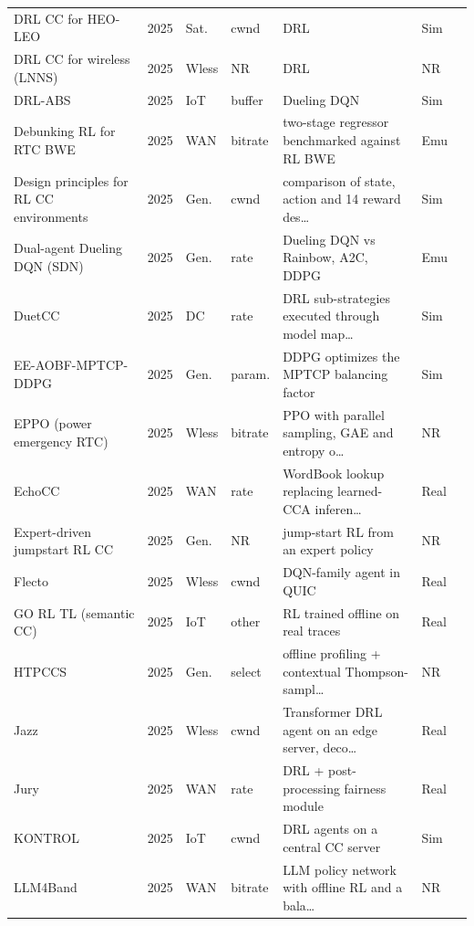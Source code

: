 \begin{small}
\begin{longtable}{@{}L{4.2cm}lllL{4.6cm}ll@{}}
DRL CC for HEO-LEO~\cite{liu2025intelligent} & 2025 & Sat. & cwnd & DRL & Sim &  \\
DRL CC for wireless (LNNS)~\cite{zala2025effective} & 2025 & Wless & NR & DRL & NR &  \\
DRL-ABS~\cite{pan2025drl} & 2025 & IoT & buffer & Dueling DQN & Sim &  \\
Debunking RL for RTC BWE~\cite{song2025debunking} & 2025 & WAN & bitrate & two-stage regressor benchmarked against RL BWE & Emu &  \\
Design principles for RL CC environments~\cite{kiarie2025design} & 2025 & Gen. & cwnd & comparison of state, action and 14 reward des… & Sim &  \\
Dual-agent Dueling DQN (SDN)~\cite{boussaoud2025dual} & 2025 & Gen. & rate & Dueling DQN vs Rainbow, A2C, DDPG & Emu &  \\
DuetCC~\cite{chengfeng2025duetcc} & 2025 & DC & rate & DRL sub-strategies executed through model map… & Sim &  \\
EE-AOBF-MPTCP-DDPG~\cite{rao2025enhancing} & 2025 & Gen. & param. & DDPG optimizes the MPTCP balancing factor & Sim &  \\
EPPO (power emergency RTC)~\cite{liu2025research} & 2025 & Wless & bitrate & PPO with parallel sampling, GAE and entropy o… & NR &  \\
EchoCC~\cite{yu2025echocc} & 2025 & WAN & rate & WordBook lookup replacing learned-CCA inferen… & Real &  \\
Expert-driven jumpstart RL CC~\cite{kiarie2025expert} & 2025 & Gen. & NR & jump-start RL from an expert policy & NR &  \\
Flecto~\cite{serra2025flecto} & 2025 & Wless & cwnd & DQN-family agent in QUIC & Real &  \\
GO RL TL (semantic CC)~\cite{kutsevol2025learning} & 2025 & IoT & other & RL trained offline on real traces & Real &  \\
HTPCCS~\cite{peng2025htpccs} & 2025 & Gen. & select & offline profiling + contextual Thompson-sampl… & NR &  \\
Jazz~\cite{wang2025edge} & 2025 & Wless & cwnd & Transformer DRL agent on an edge server, deco… & Real &  \\
Jury~\cite{tian2025jury} & 2025 & WAN & rate & DRL + post-processing fairness module & Real &  \\
KONTROL~\cite{wang2025kontrol} & 2025 & IoT & cwnd & DRL agents on a central CC server & Sim &  \\
LLM4Band~\cite{wang2025llm4band} & 2025 & WAN & bitrate & LLM policy network with offline RL and a bala… & NR &  \\

\end{longtable}
\end{small}
